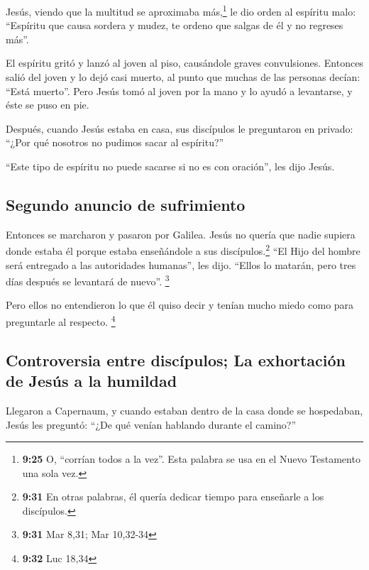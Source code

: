  Jesús, viendo que la multitud se aproximaba
más,\footnote{\textbf{9:25} O, ``corrían todos a la vez''. Esta palabra
  se usa en el Nuevo Testamento una sola vez.} le dio orden al espíritu
malo: ``Espíritu que causa sordera y mudez, te ordeno que salgas de él y
no regreses más''.

 El espíritu gritó y lanzó al joven al piso, causándole
graves convulsiones. Entonces salió del joven y lo dejó casi muerto, al
punto que muchas de las personas decían: ``Está muerto''.
 Pero Jesús tomó al joven por la mano y lo ayudó a
levantarse, y éste se puso en pie.

 Después, cuando Jesús estaba en casa, sus discípulos le
preguntaron en privado: ``¿Por qué nosotros no pudimos sacar al
espíritu?''

 ``Este tipo de espíritu no puede sacarse si no es con
oración'', les dijo Jesús.

\hypertarget{segundo-anuncio-de-sufrimiento}{%
\subsection{Segundo anuncio de
sufrimiento}\label{segundo-anuncio-de-sufrimiento}}

 Entonces se marcharon y pasaron por Galilea. Jesús no
quería que nadie supiera donde estaba él  porque estaba
enseñándole a sus discípulos.\footnote{\textbf{9:31} En otras palabras,
  él quería dedicar tiempo para enseñarle a los discípulos.} ``El Hijo
del hombre será entregado a las autoridades humanas'', les dijo. ``Ellos
lo matarán, pero tres días después se levantará de nuevo''. \footnote{\textbf{9:31}
  Mar 8,31; Mar 10,32-34}

 Pero ellos no entendieron lo que él quiso decir y tenían
mucho miedo como para preguntarle al respecto. \footnote{\textbf{9:32}
  Luc 18,34}

\hypertarget{controversia-entre-discuxedpulos-la-exhortaciuxf3n-de-jesuxfas-a-la-humildad}{%
\subsection{Controversia entre discípulos; La exhortación de Jesús a la
humildad}\label{controversia-entre-discuxedpulos-la-exhortaciuxf3n-de-jesuxfas-a-la-humildad}}

 Llegaron a Capernaum, y cuando estaban dentro de la casa
donde se hospedaban, Jesús les preguntó: ``¿De qué venían hablando
durante el camino?''

